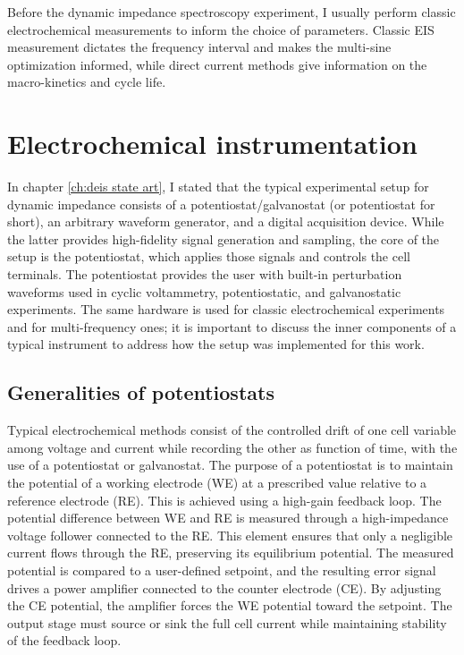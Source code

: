 Before the dynamic impedance spectroscopy experiment, I usually perform classic electrochemical measurements to inform the choice of parameters.
Classic EIS measurement dictates the frequency interval and makes the multi-sine optimization informed, while direct current methods give information on the macro-kinetics and cycle life.

\section{Electrochemical instrumentation}

In chapter \ref{ch:deis state art}, I stated that the typical experimental setup for dynamic impedance consists of a potentiostat/galvanostat (or potentiostat for short), an arbitrary waveform generator, and a digital acquisition device.
While the latter provides high-fidelity signal generation and sampling, the core of the setup is the potentiostat, which applies those signals and controls the cell terminals.
The potentiostat provides the user with built-in perturbation waveforms used in cyclic voltammetry, potentiostatic, and galvanostatic experiments.
The same hardware is used for classic electrochemical experiments and for multi-frequency ones; it is important to discuss the inner components of a typical instrument to address how the setup was implemented for this work.

\subsection{Generalities of potentiostats}
Typical electrochemical methods consist of the controlled drift of one cell variable among voltage and current while recording the other as function of time, with the use of a potentiostat or galvanostat.
The purpose of a potentiostat is to maintain the potential of a working electrode (WE) at a prescribed value relative to a reference electrode (RE).
This is achieved using a high-gain feedback loop. 
The potential difference between WE and RE is measured through a high-impedance voltage follower connected to the RE. 
This element ensures that only a negligible current flows through the RE, preserving its equilibrium potential. 
The measured potential is compared to a user-defined setpoint, and the resulting error signal drives a power amplifier connected to the counter electrode (CE). 
By adjusting the CE potential, the amplifier forces the WE potential toward the setpoint.
The output stage must source or sink the full cell current while maintaining stability of the feedback loop.

